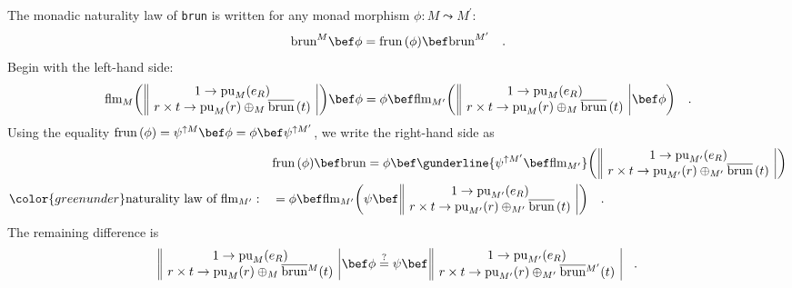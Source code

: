 The monadic naturality law of \lstinline!brun! is written for any
monad morphism $\phi:M\leadsto M^{\prime}$:
\[
\text{brun}^{M}\bef\phi=\text{frun}\,(\phi)\bef\text{brun}^{M^{\prime}}\quad.
\]
Begin with the left-hand side:
\[
\text{flm}_{M}\bigg(\,\begin{array}{||c|}
1\rightarrow\text{pu}_{M}(e_{R})\\
r\times t\rightarrow\text{pu}_{M}(r)\oplus_{M}\overline{\text{brun}}\,(t)
\end{array}\,\bigg)\bef\phi=\phi\bef\text{flm}_{M^{\prime}}\bigg(\,\begin{array}{||c|}
1\rightarrow\text{pu}_{M}(e_{R})\\
r\times t\rightarrow\text{pu}_{M}(r)\oplus_{M}\overline{\text{brun}}\,(t)
\end{array}\,\bef\phi\bigg)\quad.
\]
Using the equality $\text{frun}\,(\phi)=\psi^{\uparrow M}\bef\phi=\phi\bef\psi^{\uparrow M^{\prime}}$,
we write the right-hand side as
\begin{align*}
 & \text{frun}\,(\phi)\bef\text{brun}=\phi\bef\gunderline{\psi^{\uparrow M^{\prime}}\bef\text{flm}_{M^{\prime}}}\bigg(\,\begin{array}{||c|}
1\rightarrow\text{pu}_{M^{\prime}}(e_{R})\\
r\times t\rightarrow\text{pu}_{M^{\prime}}(r)\oplus_{M^{\prime}}\overline{\text{brun}}\,(t)
\end{array}\,\bigg)\\
{\color{greenunder}\text{naturality law of }\text{flm}_{M^{\prime}}:}\quad & =\phi\bef\text{flm}_{M^{\prime}}\bigg(\psi\bef\,\begin{array}{||c|}
1\rightarrow\text{pu}_{M^{\prime}}(e_{R})\\
r\times t\rightarrow\text{pu}_{M^{\prime}}(r)\oplus_{M^{\prime}}\overline{\text{brun}}\,(t)
\end{array}\,\bigg)\quad.
\end{align*}
The remaining difference is
\[
\begin{array}{||c|}
1\rightarrow\text{pu}_{M}(e_{R})\\
r\times t\rightarrow\text{pu}_{M}(r)\oplus_{M}\overline{\text{brun}}{}^{M}(t)
\end{array}\,\bef\phi\overset{?}{=}\psi\bef\,\begin{array}{||c|}
1\rightarrow\text{pu}_{M^{\prime}}(e_{R})\\
r\times t\rightarrow\text{pu}_{M^{\prime}}(r)\oplus_{M^{\prime}}\overline{\text{brun}}{}^{M^{\prime}}(t)
\end{array}\quad.
\]
